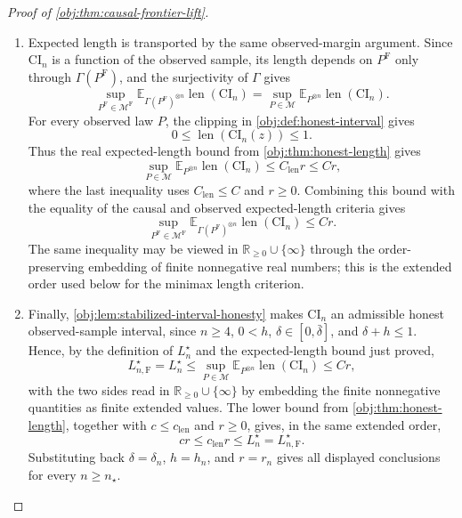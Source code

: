 \documentclass[11pt]{article}
\begin{document}
\begin{proof}[Proof of \cref{obj:thm:causal-frontier-lift}]
\begin{enumerate}
\item Expected length is transported by the same observed-margin argument.  Since
\(\mathrm{CI}_n\) is a function of the observed sample, its length depends on
\(P^{\mathrm F}\) only through \(\Gamma(P^{\mathrm F})\), and the surjectivity of
\(\Gamma\) gives
\[
\sup_{P^{\mathrm F}\in\mathcal M^{\mathrm F}}
\mathbb E_{\Gamma(P^{\mathrm F})^{\otimes n}}
\operatorname{len}(\mathrm{CI}_n)
=
\sup_{P\in\mathcal M}
\mathbb E_{P^{\otimes n}}
\operatorname{len}(\mathrm{CI}_n).
\]
For every observed law \(P\), the clipping in \cref{obj:def:honest-interval}
gives
\[
0\le \operatorname{len}(\mathrm{CI}_n(z))\le 1.
\]
Thus the real expected-length bound from \cref{obj:thm:honest-length} gives
\[
\sup_{P\in\mathcal M}
\mathbb E_{P^{\otimes n}}
\operatorname{len}(\mathrm{CI}_n)
\le
C_{\mathrm{len}} r
\le
C r,
\]
where the last inequality uses \(C_{\mathrm{len}}\le C\) and \(r\ge0\).  Combining
this bound with the equality of the causal and observed expected-length criteria gives
\[
\sup_{P^{\mathrm F}\in\mathcal M^{\mathrm F}}
\mathbb E_{\Gamma(P^{\mathrm F})^{\otimes n}}
\operatorname{len}(\mathrm{CI}_n)
\le
C r.
\]
The same inequality may be viewed in \(\mathbb R_{\ge0}\cup\{\infty\}\) through
the order-preserving embedding of finite nonnegative real numbers; this is the
extended order used below for the minimax length criterion. %

\item Finally, \cref{obj:lem:stabilized-interval-honesty} makes
\(\mathrm{CI}_n\) an admissible honest observed-sample interval, since
\(n\ge4\), \(0<h\), \(\delta\in[0,\bar\delta]\), and \(\delta+h\le1\).  Hence,
by the definition of \(L_n^\star\) and the expected-length bound just proved,
\[
L_{n,\mathrm F}^\star
=
L_n^\star
\le
\sup_{P\in\mathcal M}
\mathbb E_{P^{\otimes n}}
\operatorname{len}(\mathrm{CI}_n)
\le
C r,
\]
with the two sides read in \(\mathbb R_{\ge0}\cup\{\infty\}\) by embedding the
finite nonnegative quantities as finite extended values.  The lower bound from
\cref{obj:thm:honest-length}, together with \(c\le c_{\mathrm{len}}\) and
\(r\ge0\), gives, in the same extended order,
\[
c r
\le
c_{\mathrm{len}} r
\le
L_n^\star
=
L_{n,\mathrm F}^\star .
\]
Substituting back \(\delta=\delta_n\), \(h=h_n\), and \(r=r_n\) gives all
displayed conclusions for every \(n\ge n_\star\). %
\end{enumerate}
\end{proof}
\end{document}
